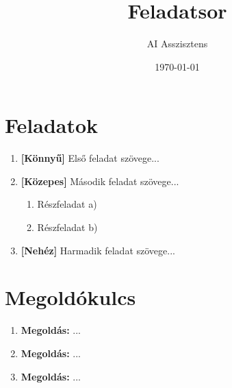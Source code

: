 \documentclass[a4paper,12pt]{article}
\title{Feladatsor}
\author{AI Asszisztens}
\date{\today}
\begin{document}
\maketitle

\section{Feladatok}

\begin{enumerate}
    \item \textbf{[Könnyű]} Első feladat szövege...
    \item \textbf{[Közepes]} Második feladat szövege...
    \begin{enumerate}
        \item Részfeladat a)
        \item Részfeladat b)
    \end{enumerate}
    \item \textbf{[Nehéz]} Harmadik feladat szövege...
\end{enumerate}

\newpage
\section{Megoldókulcs}
\begin{enumerate}
    \item \textbf{Megoldás:} ...
    \item \textbf{Megoldás:} ...
    \item \textbf{Megoldás:} ...
\end{enumerate}
\end{document}
